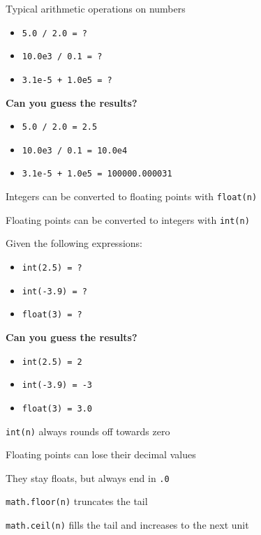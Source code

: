 \documentclass{beamer}
\begin{document}
\begin{slide}{
\item Typical arithmetic operations on numbers
\begin{itemize}
\item \texttt{5.0 / 2.0 = ?} 
\item \texttt{10.0e3 / 0.1 = ?}
\item \texttt{3.1e-5 + 1.0e5 = ?}
\end{itemize}
\item \textbf{Can you guess the results?}
\pause
\begin{itemize}
\item \texttt{5.0 / 2.0 = 2.5}
\item \texttt{10.0e3 / 0.1 = 10.0e4}
\item \texttt{3.1e-5 + 1.0e5 = 100000.000031}
\end{itemize} 
}\end{slide}

\begin{slide}{
\item Integers can be converted to floating points with \texttt{float(n)}
\item Floating points can be converted to integers with \texttt{int(n)}
}\end{slide}

\begin{slide}{
\item Given the following expressions:
\begin{itemize}
\item \texttt{int(2.5) = ?}
\item \texttt{int(-3.9) = ?}
\item \texttt{float(3) = ?}
\end{itemize}
\item \textbf{Can you guess the results?}
\pause
\begin{itemize}
\item \texttt{int(2.5) = 2}
\item \texttt{int(-3.9) = -3}
\item \texttt{float(3) = 3.0}
\end{itemize}
\item \texttt{int(n)} always rounds off towards zero
}\end{slide}

\begin{slide}{
\item Floating points can lose their decimal values
\item They stay floats, but always end in \texttt{.0}
\item \texttt{math.floor(n)} truncates the tail
\item \texttt{math.ceil(n)} fills the tail and increases to the next unit
}\end{slide}
\end{document}
